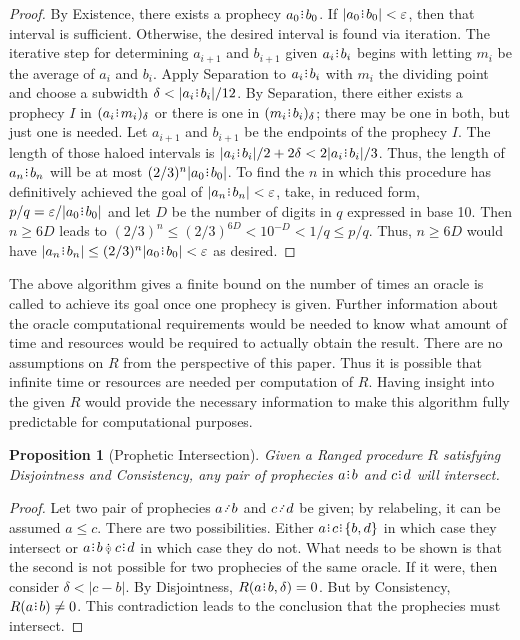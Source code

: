 \documentclass[12pt]{article}
\newtheorem{proposition}{Proposition}[section]
\begin{document}
\begin{proof}
    By Existence, there exists a prophecy $a_0\rint b_0$. If $|a_0\rint b_0| < \varepsilon$, then that interval is sufficient. Otherwise, the desired interval is found via iteration. The iterative step for determining $a_{i+1}$ and $b_{i+1}$ given $a_i\rint b_i$ begins with letting $m_i$ be the average of $a_i$ and $b_i$. Apply Separation to $a_i\rint b_i$ with $m_i$ the dividing point and choose a subwidth $\delta < |a_i\rint b_i|/12$. By Separation, there either exists a prophecy $I$ in $\halo{a_i\rint m_i}$ or there is one in $\halo{m_i\rint b_i}$; there may be one in both, but just one is needed. Let $a_{i+1}$ and $b_{i+1}$ be the endpoints of the prophecy $I$. The length of those haloed intervals is $|a_i \rint  b_i|/2 + 2 \delta < 2 |a_i\rint b_i| /3$. Thus, the length of $a_n\rint b_n$ will be at most $(2/3)^n |a_0\rint b_0|$. To find the $n$ in which this procedure has definitively achieved the goal of $|a_n\rint b_n|<\varepsilon$,  take, in reduced form, $p/q = \varepsilon/|a_0\rint b_0|$ and let $D$ be the number of digits in $q$ expressed in base 10. Then $n \geq  6D$ leads to  $(2/3)^n \leq (2/3)^{6D} < 10^{-D} < 1/q \leq p/q$. Thus, $n \geq 6D$ would have $|a_n\rint b_n| \leq (2/3)^n |a_0\rint b_0| < \varepsilon$ as desired. 
\end{proof}

The above algorithm gives a finite bound on the number of times an oracle is called to achieve its goal once one prophecy is given. Further information about the oracle computational requirements would be needed to know what amount of time and resources would be required to actually obtain the result. There are no assumptions on $R$ from the perspective of this paper. Thus it is possible that infinite time or resources are needed per computation of $R$. Having insight into the given $R$ would provide the necessary information to make this algorithm fully predictable for computational purposes. 

\begin{proposition}[Prophetic Intersection]\label{os-prointer}
     Given a Ranged procedure $R$ satisfying Disjointness and Consistency, any pair of prophecies $a\rint b$ and $c\rint d$ will intersect. 
\end{proposition}

\begin{proof}
    Let two pair of prophecies $a \lte b$ and $c \lte d$ be given; by relabeling, it can be assumed $a \leq c$. There are two possibilities. Either $a \rint  c \rint  \{ b,  d\}$ in which case they intersect or $a\rint b\betneq c\rint  d$ in which case they do not. What needs to be shown is that the second is not possible for two prophecies of the same oracle. If it were, then consider $\delta < |c-b|$. By Disjointness, $R(a\rint b, \delta) = 0$. But by Consistency,  $R(a\rint b) \neq 0$. This contradiction leads to the conclusion that the prophecies must intersect. 
\end{proof}
\end{document}
